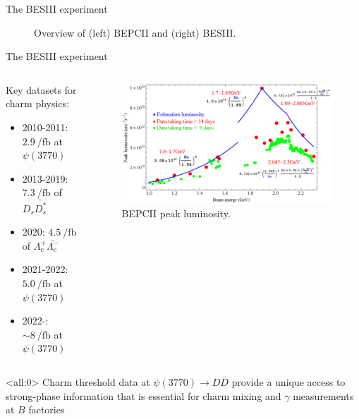 \documentclass{beamer}
\begin{document}
\begin{frame}{The BESIII experiment}
\begin{figure}
\begin{subfigure}{0.5\textwidth}
    \end{subfigure}
    \caption*{Overview of (left) BEPCII and (right) BESIII.}
  \end{figure}
\end{frame}

\begin{frame}{The BESIII experiment}
  \begin{columns}
    \begin{column}{0.5\textwidth}
      \vspace{0.0cm}
      {\large Key datasets for charm physics:}
      \begin{itemize}
      \item{2010-2011: $\SI{2.9}{\per\femto\barn}$ at $\psi(3770)$}
      \item{2013-2019: $\SI{7.3}{\per\femto\barn}$ of $D_s\bar{D_s^*}$}
      \item{2020: $\SI{4.5}{\per\femto\barn}$ of $\Lambda_c^+\bar{\Lambda_c^-}$}
      \item{2021-2022: $\SI{5.0}{\per\femto\barn}$ at $\psi(3770)$}
      \item{2022-: $\sim\SI{8}{\per\femto\barn}$ at $\psi(3770)$}
      \end{itemize}
    \end{column}
    \begin{column}{0.5\textwidth}
      \vspace{0.5cm}
      \begin{figure}
        \includegraphics[width=1.0\textwidth]{Figures/BEPCII_Luminosity.png}
        \caption*{BEPCII peak luminosity.}
      \end{figure}
    \end{column}
  \end{columns}
  \begin{block}{}<all:0>
    Charm threshold data at $\psi(3770)\to D\bar{D}$ provide a unique access to strong-phase information that is essential for charm mixing and $\gamma$ measurements at $B$ factories
  \end{block}
\end{frame}
\end{document}
